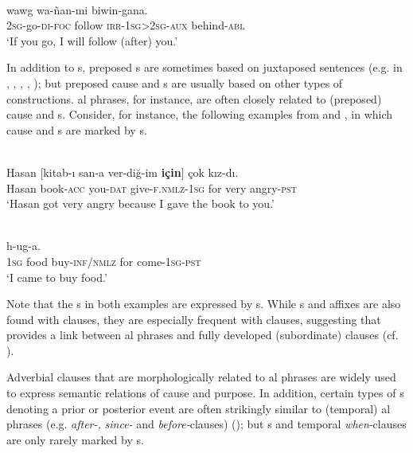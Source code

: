 \documentclass[output=paper]{langsci/langscibook}
\begin{document}
\ea\label{ex:diessel:6}
\\
\gll   [ña-yaŋ-gu=\textbf{bayi}]   wawg   wa-ñan-mi  biwin-gana.\\
       \textsc{2sg}-go-\textsc{di-foc}    follow   \textsc{irr-1sg>2sg-aux}  behind-\textsc{abl}\\
\glt   `If you go, I will follow (after) you.'
\z

In addition to s, preposed s are sometimes based on juxtaposed sentences (e.g. in , , , , ); but preposed cause and s are usually based on other types of constructions. al phrases, for instance, are often closely related to (preposed) cause and s. Consider, for instance, the following examples from   and  , in which cause and s are marked by  s. 

\ea\label{ex:diessel:7}
\\
\gll   Hasan   [kitab-ı  san-a  ver-diğ-im  \textbf{için}]  çok  kız-dı.\\
       Hasan  book-\textsc{acc}  you-\textsc{dat}  give-\textsc{f.nmlz-1sg}  for  very  angry-\textsc{pst}  \\
\glt   `Hasan got very angry because I gave the book to you.'
\z

\ea\label{ex:diessel:8}
\\
  h-ug-a.\\
       \textsc{1sg}   food   buy-\textsc{inf/nmlz}  for  come-\textsc{1sg-pst}\\
\glt   `I came to buy food.'
\z

\noindent Note that the s in both examples are expressed by s. While s and  affixes are also found with  clauses, they are especially frequent with  clauses, suggesting that  provides a link between al phrases and fully developed (subordinate) clauses (cf. \citealt{Deutscher2009,Heine2009}).

Adverbial clauses that are morphologically related to al phrases are widely used to express semantic relations of cause and purpose. In addition, certain types of s denoting a prior or posterior event are often strikingly similar to (temporal) al phrases (e.g.  \textit{after-,} \textit{since-} and \textit{before-}clauses) (\citealt{Blake1999,Hetterle2015}); but s and temporal \textit{when}-clauses are only rarely marked by s. 
\end{document}
